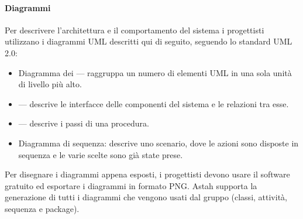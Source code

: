 \paragraph{Diagrammi} Per descrivere l'architettura e il comportamento del sistema i progettisti utilizzano i diagrammi UML descritti qui di seguito, seguendo lo standard UML 2.0:
\begin{itemize}
	\item Diagramma dei  --- raggruppa un numero di elementi UML in una sola unità di livello più alto.
	\item {} --- descrive le interfacce delle componenti del sistema e le relazioni tra esse.
	\item {} --- descrive i passi di una procedura.
	\item Diagramma di sequenza: descrive uno scenario, dove le azioni sono disposte in sequenza e le varie scelte sono già state prese.
\end{itemize}
Per disegnare i diagrammi appena esposti, i progettisti devono usare il software gratuito  ed esportare i diagrammi in formato PNG. Astah supporta la generazione di tutti i diagrammi che vengono usati dal gruppo (classi, attività, sequenza e package).


